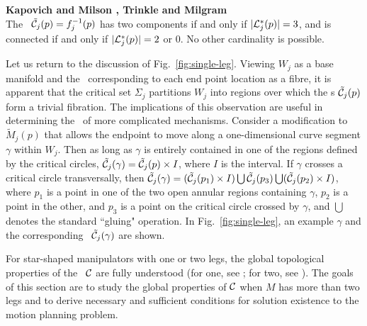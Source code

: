 \medskip
\begin{Lemma} {\bf Kapovich and Milson \cite{KM}, Trinkle and
Milgram \cite{MT2}}\\
\label{lem-02} \rm The \cspace \ $\tilde {\cal C}_j(p) =
f_j^{-1}(p)$ has two components if and only if $|{\cal
L}_j^*(p)|=3$, and is connected if and only if $|{\cal
L}_j^*(p)|=2$ or $0$. No other cardinality is possible.
\end{Lemma}

\medskip

Let us return to the discussion of Fig.~\ref{fig:single-leg}.
Viewing $W_j$ as a base manifold and the \cspace \ corresponding
to each end point location as a fibre, it is apparent that the
critical set $\Sigma_j$ partitions $W_j$ into regions over which
the \cspace s $\tilde {\cal C}_j(p)$ form a trivial fibration. The
implications of this observation are useful in determining the
\cspace \ of more complicated mechanisms.  Consider a modification
to $\tilde M_j(p)$ that allows the endpoint to move along a
one-dimensional curve segment $\gamma$ within $W_j$.  Then as long
as $\gamma$ is entirely contained in one of the regions defined by
the critical circles, $\tilde {\cal C}_j(\gamma) = \tilde {\cal
C}_j(p) \times I$, where $I$ is the interval.  If $\gamma$ crosses
a critical circle transversally, then $\tilde {\cal C}_j(\gamma) =
(\tilde {\cal C}_j(p_1) \times I) \bigcup \tilde {\cal C}_j(p_3)
\bigcup (\tilde {\cal C}_j(p_2) \times I)$, where $p_1$ is a point
in one of the two open annular regions containing $\gamma$, $p_2$
is a point in the other, and $p_3$ is a point on the critical
circle crossed by $\gamma$, and $\bigcup$ denotes the standard
``gluing" operation. In Fig.~\ref{fig:single-leg}, an example
$\gamma$ and the corresponding \cspace \ $\tilde {\cal
C}_j(\gamma)$ are shown.

 \label{section-2} For
star-shaped manipulators with one or two legs, the global
topological properties of the \cspace \ ${\cal C}$ are fully
understood (for one, see \cite{Lat92}; for two, see
\cite{MT2,MT1}). The goals of this section are to study the global
properties of ${\cal C}$ when $M$ has more than two legs and to
derive necessary and sufficient conditions for solution existence
to the motion planning problem.

